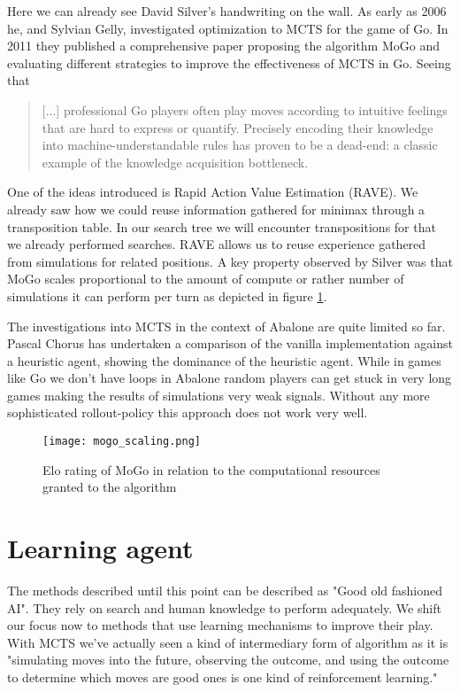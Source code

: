 Here we can already see David Silver's handwriting on the wall. As early as 2006 he, and Sylvian Gelly, investigated optimization to MCTS \cite{gelly_achieving_nodate} for the game of Go. In 2011 they published a comprehensive paper \cite{gelly_monte-carlo_2011} proposing the algorithm MoGo and evaluating different strategies to improve the effectiveness of MCTS in Go. Seeing that

\begin{quotation}
    [...] professional Go players often play moves according to intuitive feelings that are hard to express or quantify. Precisely encoding their knowledge into machine-understandable rules has proven to be a dead-end: a classic example of the knowledge acquisition bottleneck.
\end{quotation}

One of the ideas introduced is Rapid Action Value Estimation (RAVE). We already saw how we could reuse information gathered for minimax through a transposition table. In our search tree we will encounter transpositions for that we already performed searches. RAVE allows us to reuse experience gathered from simulations for related positions. A key property observed by Silver was that MoGo scales proportional to the amount of compute or rather number of simulations it can perform per turn as depicted in figure \ref{mogo_scaling}.

The investigations into MCTS in the context of Abalone are quite limited so far. Pascal Chorus has undertaken a comparison of the vanilla implementation against a heuristic agent, showing the dominance of the heuristic agent. \cite{chorus_implementing_2009} While in games like Go we don't have loops in Abalone random players can get stuck in very long games making the results of simulations very weak signals. Without any more sophisticated rollout-policy this approach does not work very well.


\begin{figure}
    \centering
    \texttt{[image: mogo\_scaling.png]}
    \caption{Elo rating of MoGo in relation to the computational resources granted to the algorithm \cite{gelly_monte-carlo_2011}}
    \label{mogo_scaling}
\end{figure}

\section{Learning agent}
The methods described until this point can be described as "Good old fashioned AI". They rely on search and human knowledge to perform adequately. We shift our focus now to methods that use learning mechanisms to improve their play. With MCTS we've actually seen a kind of intermediary form of algorithm as it is "simulating moves into the future, observing the outcome, and using the outcome to determine which moves are good ones is one kind of reinforcement learning." \cite{russell_artificial_2021}

